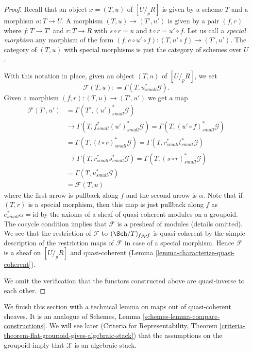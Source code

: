 \begin{proof}
\medskip\noindent
Recall that an object $x = (T, u)$ of $[U/_{\!p}R]$
is given by a scheme $T$ and a morphism $u : T \to U$. A morphism
$(T, u) \to (T', u')$ is given by a pair $(f, r)$ where $f : T \to T'$
and $r : T \to R$ with $s \circ r = u$ and $t \circ r = u' \circ f$.
Let us call a {\it special morphism} any morphism of the form
$(f, e \circ u' \circ f) : (T, u' \circ f) \to (T', u')$.
The category of $(T, u)$ with special morphisms is just the
category of schemes over $U$.

\medskip\noindent
With this notation in place, given an object $(T, u)$ of $[U/_{\!p}R]$, we set
$$
\mathcal{F}(T, u) : = \Gamma(T, u_{small}^*\mathcal{G}).
$$
Given a morphism $(f, r) : (T, u) \to (T', u')$ we get a map
\begin{align*}
\mathcal{F}(T', u') & = \Gamma(T', (u')_{small}^*\mathcal{G}) \\
& \to \Gamma(T, f_{small}^*(u')_{small}^*\mathcal{G}) =
\Gamma(T, (u' \circ f)_{small}^*\mathcal{G}) \\
& = \Gamma(T, (t \circ r)_{small}^*\mathcal{G}) =
\Gamma(T, r_{small}^*t_{small}^*\mathcal{G}) \\
& \to \Gamma(T, r_{small}^*s_{small}^*\mathcal{G}) =
\Gamma(T, (s \circ r)_{small}^*\mathcal{G}) \\
& = \Gamma(T, u_{small}^*\mathcal{G}) \\
& = \mathcal{F}(T, u)
\end{align*}
where the first arrow is pullback along $f$ and the second arrow is
$\alpha$. Note that if $(T, r)$ is a special morphism, then this
map is just pullback along $f$ as $e_{small}^*\alpha = \text{id}$ by
the axioms of a sheaf of quasi-coherent modules on a groupoid.
The cocycle condition implies that $\mathcal{F}$ is a presheaf
of modules (details omitted). We see that the restriction of $\mathcal{F}$
to $(\Sch/T)_{fppf}$ is quasi-coherent by the simple description of the
restriction maps of $\mathcal{F}$ in case of a special morphism.
Hence $\mathcal{F}$ is a sheaf on $[U/_{\!p}R]$ and quasi-coherent
(Lemma \ref{lemma-characterize-quasi-coherent}).

\medskip\noindent
We omit the verification that the functors constructed above are
quasi-inverse to each other.
\end{proof}

\noindent
We finish this section with a technical lemma on maps out of quasi-coherent
sheaves. It is an analogue of
Schemes, Lemma \ref{schemes-lemma-compare-constructions}.
We will see later (Criteria for Representability, Theorem
\ref{criteria-theorem-flat-groupoid-gives-algebraic-stack})
that the assumptions on the groupoid imply that $\mathcal{X}$ is
an algebraic stack.

